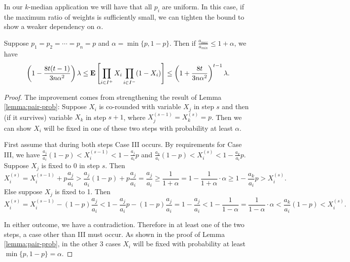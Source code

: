 In our $k$-median application we will have that all $p_i$ are uniform. In this case, if the maximum ratio of weights is sufficiently small, we can tighten the bound to show a weaker dependency on $\alpha$.
\begin{theorem}\label{cor:dep-uniform-p}
Suppose $p_1=p_2=\cdots=p_n=p$ and $\alpha = \min\{p, 1 - p\}$. Then if $\frac{a_{max}}{a_{min}}\le 1+\alpha$, we have  
\[ \left(1-\frac{8t(t-1)}{3n\alpha^2}\right) \lambda
\le \text{\bf E}\left[\prod_{i\in I^+} X_i \prod_{i \in I^-}(1-X_i) \right]
\le\left(1+\frac{8t}{3n\alpha^2}\right)^{t-1} \lambda  .\]
\end{theorem}

\begin{proof}
The improvement comes from strengthening the result of Lemma \ref{lemma:pair-prob}: Suppose $X_i$ is co-rounded with variable $X_j$ in step $s$ and then (if it survives) variable $X_k$ in step $s+1$, where $X_j^{(s-1)}=X_k^{(s)}=p$. Then we can show $X_i$ will be fixed in one of these two steps with probability at least $\alpha$.


First assume that during both steps Case III occurs. 
By requirements for Case III, we have $\frac{a_j}{a_i}(1-p)<X_i^{(s-1)}<1-\frac{a_j}{a_i}p$ and $\frac{a_k}{a_i}(1-p)<X_i^{(s)}<1-\frac{a_k}{a_i}p$. 
Suppose $X_j$ is fixed to 0 in step $s$. Then 
$$X_i^{(s)}=X_i^{(s-1)}+p\frac{a_j}{a_i}>\frac{a_j}{a_i}(1-p)+p\frac{a_j}{a_i}=\frac{a_j}{a_i}\ge\frac{1}{1+\alpha}=1-\frac{1}{1+\alpha}\cdot\alpha\ge 1-\frac{a_k}{a_i} p>X_i^{(s)}.$$ 
Else suppose $X_j$ is fixed to 1. Then
$$X_i^{(s)}=X_i^{(s-1)}-(1-p)\frac{a_j}{a_i}<1-\frac{a_j}{a_i}p-(1-p)\frac{a_j}{a_i}=1-\frac{a_j}{a_i}<1-\frac{1}{1-\alpha}
=\frac{1}{1-\alpha}\cdot\alpha<\frac{a_k}{a_i}(1-p)<X_i^{(s)}.$$

In either outcome, we have a contradiction. Therefore in at least one of the two steps, a case other than III must occur. As shown in the proof of Lemma \ref{lemma:pair-prob}, in the other 3 cases $X_i$ will be fixed with probability at least $\min\{p,1-p\}=\alpha$.


\end{proof}
